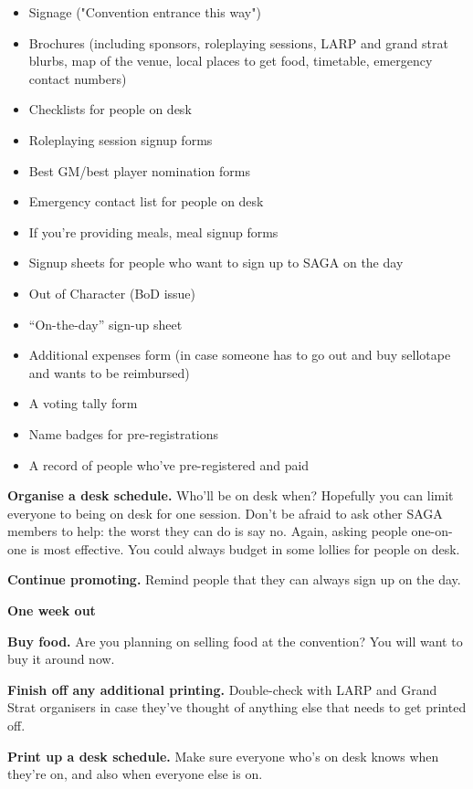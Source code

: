 \begin{itemize}
  \item Signage ("Convention entrance this way")
  \item Brochures (including sponsors, roleplaying sessions, LARP and grand strat blurbs, map of the venue, local places to get food, timetable, emergency contact numbers)
  \item Checklists for people on desk
  \item Roleplaying session signup forms
  \item Best GM/best player nomination forms
  \item Emergency contact list for people on desk
  \item If you're providing meals, meal signup forms
  \item Signup sheets for people who want to sign up to SAGA on the day
  \item Out of Character (BoD issue)
  \item ``On-the-day'' sign-up sheet
  \item Additional expenses form (in case someone has to go out and buy sellotape and wants to be reimbursed)
  \item A voting tally form
  \item Name badges for pre-registrations
  \item A record of people who've pre-registered and paid
\end{itemize}

\textbf{Organise a desk schedule.} Who'll be on desk when? Hopefully you can limit everyone to being on desk for one session. Don't be afraid to ask other SAGA members to help: the worst they can do is say no. Again, asking people one-on-one is most effective. You could always budget in some lollies for people on desk.

\textbf{Continue promoting.} Remind people that they can always sign up on the day.

\textbf{One week out}

\textbf{Buy food.} Are you planning on selling food at the convention? You will want to buy it around now.

\textbf{Finish off any additional printing.} Double-check with LARP and Grand Strat organisers in case they've thought of anything else that needs to get printed off.

\textbf{Print up a desk schedule.} Make sure everyone who's on desk knows when they're on, and also when everyone else is on.

